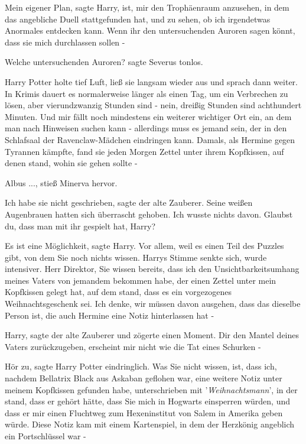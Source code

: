\glqq{}Mein eigener Plan\grqq{}, sagte Harry, \glqq{}ist, mir den Trophäenraum
anzusehen, in dem das angebliche Duell stattgefunden hat, und zu sehen, ob ich
irgendetwas Anormales entdecken kann. Wenn ihr den untersuchenden Auroren sagen
könnt, dass sie mich durchlassen sollen -\grqq{}

\glqq{}Welche untersuchenden Auroren?\grqq{} sagte Severus tonlos.

Harry Potter holte tief Luft, ließ sie langsam wieder aus und sprach dann
weiter. \glqq{}In Krimis dauert es normalerweise länger als einen Tag, um ein
Verbrechen zu lösen, aber vierundzwanzig Stunden sind - nein, dreißig Stunden
sind achthundert Minuten. Und mir fällt noch mindestens ein weiterer wichtiger
Ort ein, an dem man nach Hinweisen suchen kann - allerdings muss es jemand sein,
der in den Schlafsaal der Ravenclaw-Mädchen eindringen kann. Damals, als Hermine
gegen Tyrannen kämpfte, fand sie jeden Morgen Zettel unter ihrem Kopfkissen, auf
denen stand, wohin sie gehen sollte -\grqq{}

\glqq{}Albus ...\grqq{}, stieß Minerva hervor.

\glqq{}Ich habe sie nicht geschrieben\grqq{}, sagte der alte Zauberer. Seine
weißen Augenbrauen hatten sich überrascht gehoben. \glqq{}Ich wusste nichts
davon. Glaubst du, dass man mit ihr gespielt hat, Harry?\grqq{}

\glqq{}Es ist eine Möglichkeit\grqq{}, sagte Harry. \glqq{}Vor allem, weil es
einen Teil des Puzzles gibt, von dem Sie noch nichts wissen.\grqq{} Harrys
Stimme senkte sich, wurde intensiver. \glqq{}Herr Direktor, Sie wissen bereits,
dass ich den Unsichtbarkeitsumhang meines Vaters von jemandem bekommen habe, der
einen Zettel unter mein Kopfkissen gelegt hat, auf dem stand, dass es ein
vorgezogenes Weihnachtsgeschenk sei. Ich denke, wir müssen davon ausgehen, dass
das dieselbe Person ist, die auch Hermine eine Notiz hinterlassen hat -\grqq{}

\glqq{}Harry\grqq{}, sagte der alte Zauberer und zögerte einen Moment. \glqq{}Dir
den Mantel deines Vaters zurückzugeben, erscheint mir nicht wie die Tat eines
Schurken -\grqq{}

\glqq{}Hör zu\grqq{}, sagte Harry Potter eindringlich. \glqq{}Was Sie nicht
wissen, ist, dass ich, nachdem Bellatrix Black aus Askaban geflohen war, eine
weitere Notiz unter meinem Kopfkissen gefunden habe, unterschrieben mit
'\emph{Weihnachtsmann}', in der stand, dass er gehört hätte, dass Sie mich in
Hogwarts einsperren würden, und dass er mir einen Fluchtweg zum Hexeninstitut
von Salem in Amerika geben würde. Diese Notiz kam mit einem Kartenspiel, in dem
der Herzkönig angeblich ein Portschlüssel war -\grqq{}

